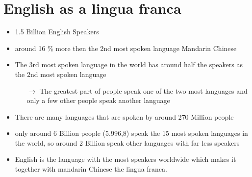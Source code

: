 \documentclass[12pt,a4paper]{report}
\begin{document}
	\section{English as a lingua franca}
	\begin{itemize}
		\item 1.5 Billion English Speakers
		\item around 16 \% more then the 2nd most spoken language Mandarin Chinese
		\item The 3rd most spoken language in the world has around half the speakers as the 2nd most spoken language
		\begin{itemize}
			\item[$\to$] The greatest part of people speak one of the two most languages and only a few other people speak another language
		\end{itemize}
		\item There are many languages that are spoken by around 270 Million people
		\item only around 6 Billion people (5.996,8) speak the 15 most spoken languages in the world, so around 2 Billion speak other languages with far less speakers
		\item English is the language with the most speakers worldwide which makes it together with mandarin Chinese the lingua franca.
	\end{itemize}
\end{document}
